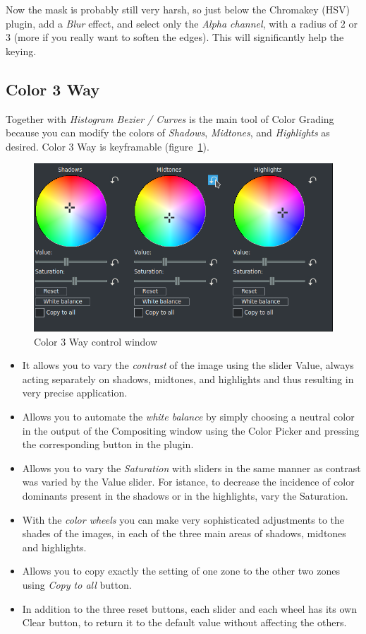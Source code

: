 Now the mask is probably still very harsh, so just below the Chromakey (HSV) plugin, add a \textit{Blur} effect, and select only the \textit{Alpha channel}, with a radius of $2$ or $3$ (more if you really want to soften the edges). This will significantly help the keying.

\subsection{Color 3 Way}%
\label{sub:color_3_way}

Together with \textit{Histogram Bezier / Curves} is the main tool of Color Grading because you can modify the colors of \textit{Shadows}, \textit{Midtones}, and \textit{Highlights} as desired. Color 3 Way is keyframable (figure~\ref{fig:color3way}).

\begin{figure}[htpb]
    \centering
    \includegraphics[width=0.8\linewidth]{images/color3way.png}
    \caption{Color 3 Way control window}
    \label{fig:color3way}
\end{figure}

\begin{itemize}
    \item It allows you to vary the \textit{contrast} of the image using the slider Value, always acting separately on shadows, midtones, and highlights and thus resulting in very precise application.
    \item Allows you to automate the \textit{white balance} by simply choosing a neutral color in the output of the Compositing window using the Color Picker and pressing the corresponding button in the plugin.
    \item Allows you to vary the \textit{Saturation} with sliders in the same manner as contrast was varied by the Value slider. For istance, to decrease the incidence of color dominants present in the shadows or in the highlights, vary the Saturation.
    \item With the \textit{color wheels} you can make very sophisticated adjustments to the shades of the images, in each of the three main areas of shadows, midtones and highlights.
    \item Allows you to copy exactly the setting of one zone to the other two zones using \textit{Copy to all} button.
    \item In addition to the three reset buttons, each slider and each wheel has its own Clear button, to return it to the default value without affecting the others.
\end{itemize}


